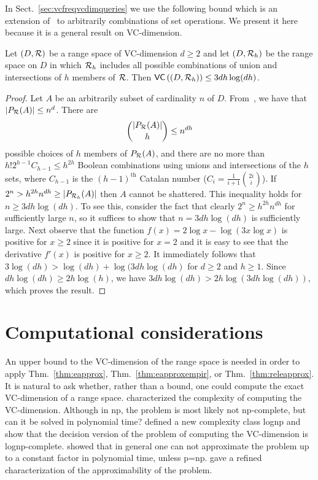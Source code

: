 In Sect.~\ref{sec:vcfreqvcdimqueries} we use the following bound
which is an extension of~\citep[Corol.~14.4.3]{AlonS08} to arbitrarily
combinations of set operations. We present it here because it is a general
result on VC-dimension.

\begin{lemma}\label{lem:genboolcomp}
   Let $(D,\mathcal{R})$ be a range space of VC-dimension $d\ge 2$ and let $(D,\mathcal{R}_h)$ be the
  range space on $D$ in which $\mathcal{R}_h$ includes all possible combinations of 
    union and intersections of $h$ members of $\mathcal{R}$. Then
    $\mathsf{VC}\left((D,\mathcal{R}_h)\right)\le 3dh\log(dh)$.
\end{lemma}

\begin{proof}
  Let $A$ be an arbitrarily subset of cardinality $n$ of $D$.
  From~\citep[Coroll.~14.4.2]{AlonS08}, we have that $|P_{\mathcal{R}}(A)|\le n^d$. There are 
  \[
  \binom{|P_{\mathcal{R}}(A)|}{h}\le  n^{dh} \]
  possible choices of $h$ members of $P_{\mathcal{R}}(A)$, and there are no more
  than $ h! 2^{h-1} C_{h-1}\leq h^{2h}$
  Boolean combinations using unions and intersections of the $h$ sets, where
  $C_{h-1}$ is the $(h-1)^{\mathrm{th}}$ Catalan number
  ($C_i=\frac{1}{i+1}\binom{2i}{i}$). If $2^n> h^{2h}n^{dh} \geq |P_{\mathcal{R}_h}(A)|$
  then $A$ cannot be shattered. This inequality holds for $n\ge 3dh\log(dh)$. To
  see this, consider the fact that clearly $2^n\ge h^{2h}n^{dh}$ for
  sufficiently large $n$, so it suffices to show that $n=3dh\log(dh)$ is
  sufficiently large. Next observe that the function $f(x)=2\log x-\log(3x\log
  x)$ is positive for $x\ge 2$ since it is positive for $x=2$ and it is easy to
  see that the derivative $f'(x)$ is positive for $x\ge 2$. It immediately
  follows that $3\log(dh)> \log(dh)+\log(3dh\log(dh)$ for $d\ge2$ and $h\ge1$.
  Since $dh\log(dh)\ge 2h\log(h)$, we have $3dh\log(dh)> 2h\log(3dh\log(dh))$,
  which proves the result.
\end{proof}

\section{Computational considerations}\label{sec:vccomputcons}
An upper bound to the VC-dimension of the range space is needed in order to
apply Thm.~\ref{thm:eapprox}, Thm.~\ref{thm:eapproxempir}, or
Thm.~\ref{thm:releapprox}. It is natural to ask whether, rather than a bound, one
could compute the exact VC-dimension of a range space. \citet{PapadimitriouY96}
characterized the complexity of computing the VC-dimension. Although in {\sc
np}, the problem is most likely not {\sc np}-complete, but can it be solved in
polynomial time?  \citet{PapadimitriouY96} defined a new complexity class {\sc
lognp} and show that the decision version of the problem of computing the
VC-dimension is {\sc lognp}-complete. \citet{Schaefer99} showed that in general
one can not approximate the problem up to a constant factor in polynomial time,
unless {\sc p}={\sc np}. \citet{MosselU01} gave a refined characterization of
the approximability of the problem.

